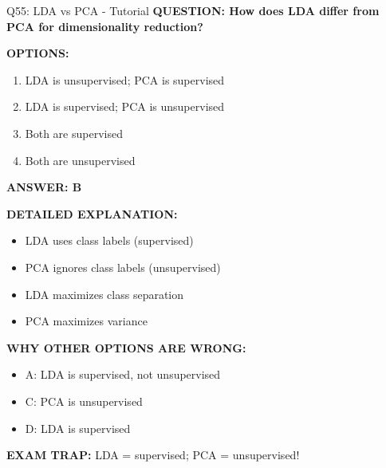 \documentclass[8pt]{beamer}
\begin{document}
\begin{frame}{Q55: LDA vs PCA - Tutorial}
	\fontsize{6.5}{7.5}\selectfont
	\textbf{QUESTION: How does LDA differ from PCA for dimensionality reduction?}
	
	\vspace{0.1cm}
	\textbf{OPTIONS:}
	\begin{enumerate}
		\item LDA is unsupervised; PCA is supervised
		\item LDA is supervised; PCA is unsupervised
		\item Both are supervised
		\item Both are unsupervised
	\end{enumerate}
	
	\vspace{0.1cm}
	\textcolor{myblue}{\textbf{ANSWER: B}}
	
	\vspace{0.1cm}
	\textbf{DETAILED EXPLANATION:}
	\begin{itemize}
		\item LDA uses class labels (supervised)
		\item PCA ignores class labels (unsupervised)
		\item LDA maximizes class separation
		\item PCA maximizes variance
	\end{itemize}
	
	\vspace{0.1cm}
	\textcolor{myred}{\textbf{WHY OTHER OPTIONS ARE WRONG:}}
	\begin{itemize}
		\item \textcolor{myred}{A:} LDA is supervised, not unsupervised
		\item \textcolor{myred}{C:} PCA is unsupervised
		\item \textcolor{myred}{D:} LDA is supervised
	\end{itemize}
	
	\textcolor{myred}{\textbf{EXAM TRAP:}} LDA = \textcolor{myblue}{supervised}; PCA = \textcolor{myblue}{unsupervised}!
\end{frame}


	
\end{document}

